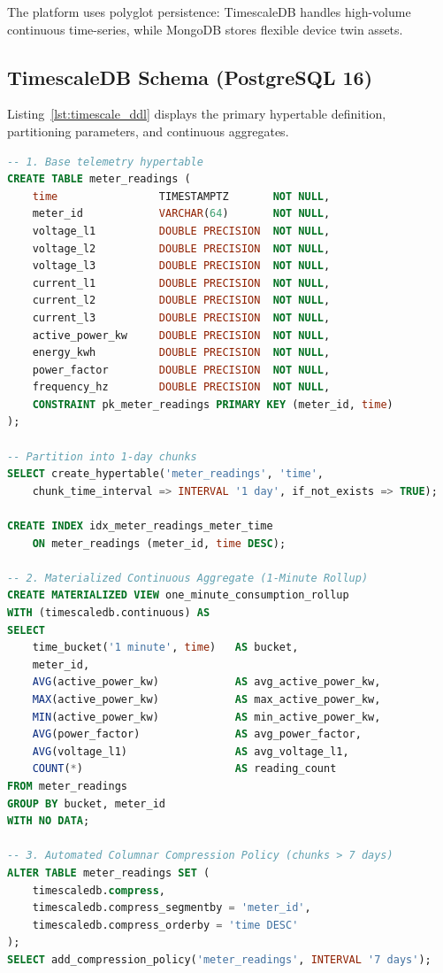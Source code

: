 \documentclass[11pt,a4paper]{article}
\begin{document}
The platform uses polyglot persistence: TimescaleDB handles high-volume continuous time-series, while MongoDB stores flexible device twin assets.

\subsection{TimescaleDB Schema (PostgreSQL 16)}

Listing~\ref{lst:timescale_ddl} displays the primary hypertable definition, partitioning parameters, and continuous aggregates.

\begin{lstlisting}[language=SQL, caption={TimescaleDB Hypertable \& Continuous Aggregate DDL}, label={lst:timescale_ddl}]
-- 1. Base telemetry hypertable
CREATE TABLE meter_readings (
    time                TIMESTAMPTZ       NOT NULL,
    meter_id            VARCHAR(64)       NOT NULL,
    voltage_l1          DOUBLE PRECISION  NOT NULL,
    voltage_l2          DOUBLE PRECISION  NOT NULL,
    voltage_l3          DOUBLE PRECISION  NOT NULL,
    current_l1          DOUBLE PRECISION  NOT NULL,
    current_l2          DOUBLE PRECISION  NOT NULL,
    current_l3          DOUBLE PRECISION  NOT NULL,
    active_power_kw     DOUBLE PRECISION  NOT NULL,
    energy_kwh          DOUBLE PRECISION  NOT NULL,
    power_factor        DOUBLE PRECISION  NOT NULL,
    frequency_hz        DOUBLE PRECISION  NOT NULL,
    CONSTRAINT pk_meter_readings PRIMARY KEY (meter_id, time)
);

-- Partition into 1-day chunks
SELECT create_hypertable('meter_readings', 'time',
    chunk_time_interval => INTERVAL '1 day', if_not_exists => TRUE);

CREATE INDEX idx_meter_readings_meter_time 
    ON meter_readings (meter_id, time DESC);

-- 2. Materialized Continuous Aggregate (1-Minute Rollup)
CREATE MATERIALIZED VIEW one_minute_consumption_rollup
WITH (timescaledb.continuous) AS
SELECT
    time_bucket('1 minute', time)   AS bucket,
    meter_id,
    AVG(active_power_kw)            AS avg_active_power_kw,
    MAX(active_power_kw)            AS max_active_power_kw,
    MIN(active_power_kw)            AS min_active_power_kw,
    AVG(power_factor)               AS avg_power_factor,
    AVG(voltage_l1)                 AS avg_voltage_l1,
    COUNT(*)                        AS reading_count
FROM meter_readings
GROUP BY bucket, meter_id
WITH NO DATA;

-- 3. Automated Columnar Compression Policy (chunks > 7 days)
ALTER TABLE meter_readings SET (
    timescaledb.compress,
    timescaledb.compress_segmentby = 'meter_id',
    timescaledb.compress_orderby = 'time DESC'
);
SELECT add_compression_policy('meter_readings', INTERVAL '7 days');
\end{lstlisting}
\end{document}
